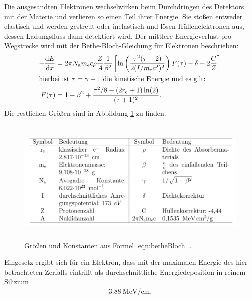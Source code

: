 Die ausgesandten Elektronen wechselwirken beim Durchdringen des Detektors mit der Materie und verlieren so einen Teil ihrer Energie.
Sie stoßen entweder elastisch und werden gestreut oder inelastisch und lösen Hüllenelektronen aus, dessen Ladungsfluss dann detektiert wird. Der mittlere Energieverlust pro Wegstrecke wird mit der Bethe-Bloch-Gleichung für Elektronen beschrieben:
\begin{align}
  - \frac{\mathop{}\!\mathrm{d} E}{\mathop{}\!\mathrm{d} x} &= 2 \pi N_\text{a} m_\text{e} c \rho \frac{Z}{A} \frac{1}{\beta^2} \left[ \ln\left(\frac{\tau^2(\tau+2)}{2(I/m_\text{e}c^2)^2}\right)
  F(\tau)-\delta-2\frac{C}{Z}\right] \label{eqn:betheBloch}\\
  \intertext{hierbei ist $\tau = \gamma - 1$ die kinetische Energie und es gilt:}
  F(\tau) &= 1-\beta^2 + \frac{\tau^2/8 - (2 r_\text{e} + 1)\ln(2)}{(\tau + 1)^2}.
\end{align}
Die restlichen Größen sind in Abbildung \ref{fig:tabelleBetheBloch} zu finden.
\begin{figure}
  \centering
  \includegraphics[height=6cm]{TimosAufrisse/tabelleBetheBloch.png}
  \caption{Größen und Konstanten aus Formel \eqref{eqn:betheBloch} \cite{anleitung}.}
  \label{fig:tabelleBetheBloch}
\end{figure}
Eingesetz ergibt sich für ein Elektron, dass mit der maximalen Energie des hier betrachteten Zerfalls eintrifft  als durchschnittliche Energiedeposition in reinem Silizium
\begin{align}
  \SI{3.88}{\mega\electronvolt\per\centi\meter}.
  \label{eqn:energieverlustdis}
\end{align}

